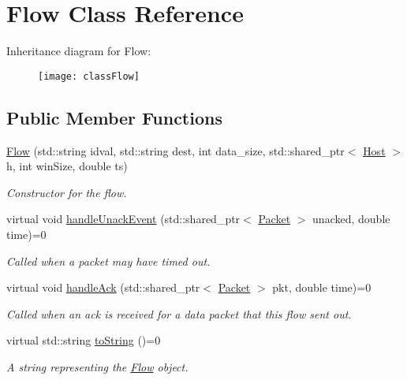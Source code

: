 \hypertarget{classFlow}{\section{\-Flow \-Class \-Reference}
\label{classFlow}
}
\-Inheritance diagram for \-Flow\-:\begin{figure}[H]
\begin{center}
\leavevmode
\texttt{[image: classFlow]}
\end{center}
\end{figure}
\subsection*{\-Public \-Member \-Functions}
\begin{DoxyCompactItemize}
\item 
\hyperlink{classFlow_ab7771ce5ed20e19fff6bf6ceb5d1adc4}{\-Flow} (std\-::string idval, std\-::string dest, int data\-\_\-size, std\-::shared\-\_\-ptr$<$ \hyperlink{classHost}{\-Host} $>$ h, int win\-Size, double ts)
\begin{DoxyCompactList}\small\item\em \-Constructor for the flow. \end{DoxyCompactList}\item 
virtual void \hyperlink{classFlow_a8a45fd871502fad3fb23987ac773a0ab}{handle\-Unack\-Event} (std\-::shared\-\_\-ptr$<$ \hyperlink{classPacket}{\-Packet} $>$ unacked, double time)=0
\begin{DoxyCompactList}\small\item\em \-Called when a packet may have timed out. \end{DoxyCompactList}\item 
virtual void \hyperlink{classFlow_ab75994d89f53573e60a1650dcaeddabb}{handle\-Ack} (std\-::shared\-\_\-ptr$<$ \hyperlink{classPacket}{\-Packet} $>$ pkt, double time)=0
\begin{DoxyCompactList}\small\item\em \-Called when an ack is received for a data packet that this flow sent out. \end{DoxyCompactList}\item 
virtual std\-::string \hyperlink{classFlow_aa74099113ee1c2298874b85ade05be98}{to\-String} ()=0
\begin{DoxyCompactList}\small\item\em \-A string representing the \hyperlink{classFlow}{\-Flow} object. \end{DoxyCompactList}\item 

\end{DoxyCompactItemize}
